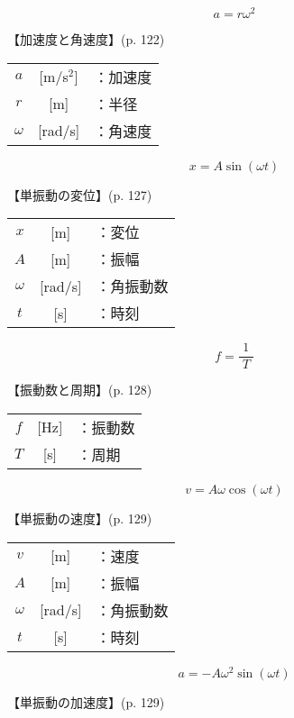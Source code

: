 \documentclass[10pt]{jarticle}
\begin{document}
\newpage
\[
	a = r \omega^2
\]


\vskip3mm
【加速度と角速度】{\footnotesize (p. 122)}

\begin{tabular}{ccl}
$a$	&[m/s$^2$]	&：加速度\\
$r$	&[m]	&：半径\\
$\omega $	&[rad/s]	&：角速度
\end{tabular}





\newpage
\[
	x = A \sin (\omega t)
\]


\vskip3mm
【単振動の変位】{\footnotesize (p. 127)}

\begin{tabular}{ccl}
$x$	&[m]&	：変位\\
$A$	&[m]	&：振幅\\
$\omega $	&[rad/s]	&：角振動数 \\
$t$	&[s]	&：時刻 \\
\end{tabular}





\newpage
\[
f = \frac{1}{\; T \;}
\]


\vskip3mm
【振動数と周期】{\footnotesize (p. 128)}

\begin{tabular}{ccl}
$f$	& [Hz]	&：振動数\\
$T$	&[s]	&：周期
\end{tabular}




\newpage
\[
	v = A \omega \cos (\omega t)
\]


\vskip3mm
【単振動の速度】{\footnotesize (p. 129)}

\begin{tabular}{ccl}
$v$	&[m]&	：速度\\
$A$	&[m]	&：振幅\\
$\omega $	&[rad/s]	&：角振動数 \\
$t$	&[s]	&：時刻 \\
\end{tabular}



\newpage
\[
	a = -A \omega^2 \sin (\omega t)
\]


\vskip3mm
【単振動の加速度】{\footnotesize (p. 129)}
\end{document}
